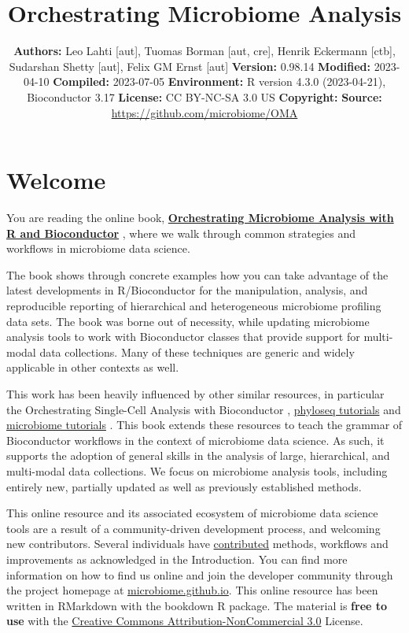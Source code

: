 \documentclass[
]{book}
\title{Orchestrating Microbiome Analysis}
\author{}
\date{\vspace{-2.5em}\textbf{Authors:} Leo Lahti {[}aut{]}, Tuomas Borman {[}aut, cre{]}, Henrik Eckermann {[}ctb{]}, Sudarshan Shetty {[}aut{]}, Felix GM Ernst {[}aut{]} \textbf{Version:} 0.98.14 \textbf{Modified:} 2023-04-10 \textbf{Compiled:} 2023-07-05 \textbf{Environment:} R version 4.3.0 (2023-04-21), Bioconductor 3.17 \textbf{License:} CC BY-NC-SA 3.0 US \textbf{Copyright:} \textbf{Source:} \url{https://github.com/microbiome/OMA}}
\begin{document}
\maketitle

{
\setcounter{tocdepth}{1}
\tableofcontents
}
\hypertarget{welcome}{%
\chapter*{Welcome}\label{welcome}}

You are reading the online book, \href{https://microbiome.github.io/OMA/}{\textbf{Orchestrating Microbiome Analysis
with R and Bioconductor}} \citep{OMA}, where we
walk through common strategies and workflows in microbiome data
science.

The book shows through concrete examples how you can take advantage of
the latest developments in R/Bioconductor for the manipulation,
analysis, and reproducible reporting of hierarchical and heterogeneous
microbiome profiling data sets. The book was borne out of necessity,
while updating microbiome analysis tools to work with Bioconductor
classes that provide support for multi-modal data collections. Many of
these techniques are generic and widely applicable in other contexts
as well.

This work has been heavily influenced by other similar resources, in
particular the Orchestrating Single-Cell Analysis with Bioconductor
\citep{Amezquita2020}, \href{http://joey711.github.io/phyloseq/tutorials-index}{phyloseq
tutorials}
\citep{Callahan2016} and \href{https://microbiome.github.io/tutorials/}{microbiome
tutorials} \citep{Shetty2019}.
This book extends these resources to teach the grammar of Bioconductor
workflows in the context of microbiome data science. As such, it
supports the adoption of general skills in the analysis of large,
hierarchical, and multi-modal data collections. We focus on microbiome
analysis tools, including entirely new, partially updated as well as
previously established methods.

This online resource and its associated ecosystem of microbiome data
science tools are a result of a community-driven development process,
and welcoming new contributors. Several individuals have
\href{https://github.com/microbiome/OMA/graphs/contributors}{contributed}
methods, workflows and improvements as acknowledged in the
Introduction. You can find more information on how to find us online
and join the developer community through the project homepage at
\href{https://microbiome.github.io}{microbiome.github.io}. This online
resource has been written in RMarkdown with the bookdown R
package. The material is \textbf{free to use} with the \href{https://creativecommons.org/licenses/by-nc/3.0/us/}{Creative Commons
Attribution-NonCommercial
3.0} License.
\end{document}
